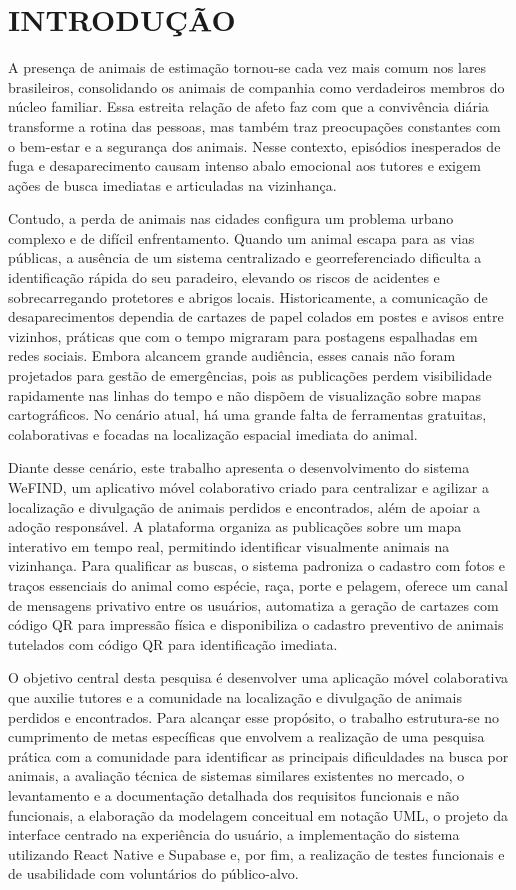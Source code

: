 \section{INTRODUÇÃO}

A presença de animais de estimação tornou-se cada vez mais comum nos lares brasileiros, consolidando os animais de companhia como verdadeiros membros do núcleo familiar. Essa estreita relação de afeto faz com que a convivência diária transforme a rotina das pessoas, mas também traz preocupações constantes com o bem-estar e a segurança dos animais. Nesse contexto, episódios inesperados de fuga e desaparecimento causam intenso abalo emocional aos tutores e exigem ações de busca imediatas e articuladas na vizinhança.

Contudo, a perda de animais nas cidades configura um problema urbano complexo e de difícil enfrentamento. Quando um animal escapa para as vias públicas, a ausência de um sistema centralizado e georreferenciado dificulta a identificação rápida do seu paradeiro, elevando os riscos de acidentes e sobrecarregando protetores e abrigos locais. Historicamente, a comunicação de desaparecimentos dependia de cartazes de papel colados em postes e avisos entre vizinhos, práticas que com o tempo migraram para postagens espalhadas em redes sociais. Embora alcancem grande audiência, esses canais não foram projetados para gestão de emergências, pois as publicações perdem visibilidade rapidamente nas linhas do tempo e não dispõem de visualização sobre mapas cartográficos. No cenário atual, há uma grande falta de ferramentas gratuitas, colaborativas e focadas na localização espacial imediata do animal.

Diante desse cenário, este trabalho apresenta o desenvolvimento do sistema WeFIND, um aplicativo móvel colaborativo criado para centralizar e agilizar a localização e divulgação de animais perdidos e encontrados, além de apoiar a adoção responsável. A plataforma organiza as publicações sobre um mapa interativo em tempo real, permitindo identificar visualmente animais na vizinhança. Para qualificar as buscas, o sistema padroniza o cadastro com fotos e traços essenciais do animal como espécie, raça, porte e pelagem, oferece um canal de mensagens privativo entre os usuários, automatiza a geração de cartazes com código QR para impressão física e disponibiliza o cadastro preventivo de animais tutelados com código QR para identificação imediata.

O objetivo central desta pesquisa é desenvolver uma aplicação móvel colaborativa que auxilie tutores e a comunidade na localização e divulgação de animais perdidos e encontrados. Para alcançar esse propósito, o trabalho estrutura-se no cumprimento de metas específicas que envolvem a realização de uma pesquisa prática com a comunidade para identificar as principais dificuldades na busca por animais, a avaliação técnica de sistemas similares existentes no mercado, o levantamento e a documentação detalhada dos requisitos funcionais e não funcionais, a elaboração da modelagem conceitual em notação UML, o projeto da interface centrado na experiência do usuário, a implementação do sistema utilizando React Native e Supabase e, por fim, a realização de testes funcionais e de usabilidade com voluntários do público-alvo.

